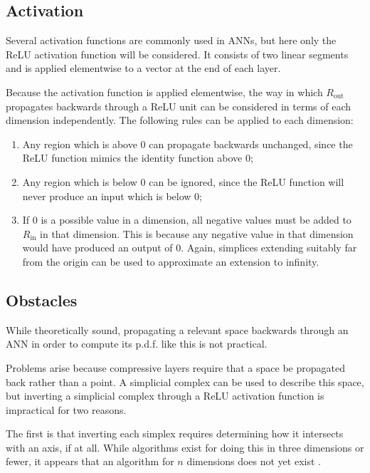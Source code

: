 \documentclass[../../main.tex]{subfiles}
\begin{document}
\subsection{Activation} \label{subsection:activation}

Several activation functions are commonly used in ANNs, but here only the ReLU activation function \cite{agarap19} will be considered.
It consists of two linear segments and is applied elementwise to a vector at the end of each layer.

Because the activation function is applied elementwise, the way in which $R_\text{out}$ propagates backwards through a ReLU unit can be considered in terms of each dimension independently.
The following rules can be applied to each dimension:
\begin{enumerate}
    \item Any region which is above $0$ can propagate backwards unchanged, since the ReLU function mimics the identity function above $0$;
    \item Any region which is below $0$ can be ignored, since the ReLU function will never produce an input which is below $0$;
    \item If $0$ is a possible value in a dimension, all negative values must be added to $R_\text{in}$ in that dimension.
    This is because any negative value in that dimension would have produced an output of $0$.
    Again, simplices extending suitably far from the origin can be used to approximate an extension to infinity.
\end{enumerate}

\subsection{Obstacles} \label{subsection:obstacles}

While theoretically sound, propagating a relevant space backwards through an ANN in order to compute its p.d.f. like this is not practical.

Problems arise because compressive layers require that a space be propagated back rather than a point.
A simplicial complex can be used to describe this space, but inverting a simplicial complex through a ReLU activation function is impractical for two reasons.

The first is that inverting each simplex requires determining how it intersects with an axis, if at all.
While algorithms exist for doing this in three dimensions or fewer, it appears that an algorithm for $n$ dimensions does not yet exist \cite{wildberger12}.
\end{document}
